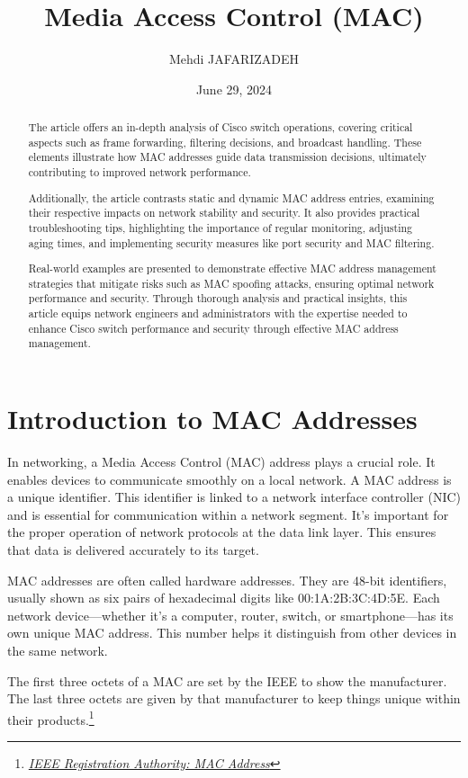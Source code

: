 \documentclass[11pt,a4paper]{article}
\title{Media Access Control (MAC)}
\author{Mehdi JAFARIZADEH}
\date{June 29, 2024}
\begin{document}
\maketitle

\begin{abstract}
    The article offers an in-depth analysis of Cisco switch operations, covering critical aspects such as frame forwarding, filtering decisions, and broadcast handling. These elements illustrate how MAC addresses guide data transmission decisions, ultimately contributing to improved network performance.

    Additionally, the article contrasts static and dynamic MAC address entries, examining their respective impacts on network stability and security. It also provides practical troubleshooting tips, highlighting the importance of regular monitoring, adjusting aging times, and implementing security measures like port security and MAC filtering.

    Real-world examples are presented to demonstrate effective MAC address management strategies that mitigate risks such as MAC spoofing attacks, ensuring optimal network performance and security. Through thorough analysis and practical insights, this article equips network engineers and administrators with the expertise needed to enhance Cisco switch performance and security through effective MAC address management.
\end{abstract}


\section*{Introduction to MAC Addresses}
In networking, a Media Access Control (MAC) address plays a crucial role. It enables devices to communicate smoothly on a local network. A MAC address is a unique identifier. This identifier is linked to a network interface controller (NIC) and is essential for communication within a network segment. It’s important for the proper operation of network protocols at the data link layer. This ensures that data is delivered accurately to its target.

MAC addresses are often called hardware addresses. They are 48-bit identifiers, usually shown as six pairs of hexadecimal digits like 00:1A:2B:3C:4D:5E. Each network device—whether it's a computer, router, switch, or smartphone—has its own unique MAC address. This number helps it distinguish from other devices in the same network.

The first three octets of a MAC are set by the IEEE to show the manufacturer. The last three octets are given by that manufacturer to keep things unique within their products.\footnote{\href{https://standards.ieee.org/products-programs/regauth/}{\textit{IEEE Registration Authority: MAC Address}}}
\end{document}
